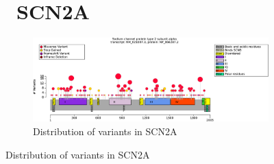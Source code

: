 \begin{figure}[htbp]
\section*{ SCN2A}
\centering
\begin{subfigure}[b]{0.95\textwidth}
\centering
\includegraphics[width=\textwidth]{ img/SCN2A_protein_diagram.pdf} 
\captionsetup{justification=raggedright,singlelinecheck=false}
\caption{Distribution of variants in SCN2A}
\end{subfigure}

\vspace{2em}


\end{figure}
